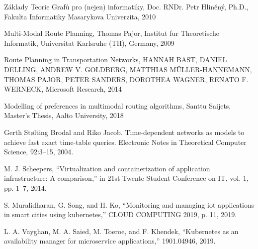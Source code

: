 \documentclass[thesis=M,czech]{FITthesis}[2019/12/23]
\theoremstyle{plain}
\theoremstyle{definition}
\begin{document}
\begin{thebibliography}{9}

	



	Základy Teorie Grafů pro (nejen) informatiky, Doc. RNDr. Petr Hliněný, Ph.D., Fakulta Informatiky Masarykova Univerzita, 2010


	Multi-Modal Route Planning, Thomas Pajor, Institut fur Theoretische Informatik, Universitat Karlsruhe (TH), Germany, 2009

	Route Planning in Transportation Networks, HANNAH BAST, DANIEL DELLING, ANDREW V. GOLDBERG, MATTHIAS MÜLLER-HANNEMANN, THOMAS PAJOR, PETER SANDERS, DOROTHEA WAGNER, RENATO F. WERNECK, Microsoft Research, 2014


	Modelling of preferences in multimodal routing algorithms, Santtu Saijets, Master’s Thesis, Aalto University, 2018


	Gerth Stølting Brodal and Riko Jacob. Time-dependent networks as models to achieve fast exact time-table queries. Electronic Notes in Theoretical Computer Science, 92:3–15, 2004.



	M. J. Scheepers, “Virtualization and containerization of application infrastructure: A comparison,” in 21st Twente Student Conference on IT, vol. 1,
	pp. 1–7, 2014.


	S. Muralidharan, G. Song, and H. Ko, “Monitoring and managing iot applications in smart cities using kubernetes,” CLOUD COMPUTING 2019,
	p. 11, 2019.


	L. A. Vayghan, M. A. Saied, M. Toeroe, and F. Khendek, “Kubernetes as an availability manager for microservice applications,” 1901.04946, 2019.


\end{thebibliography}
\end{document}
